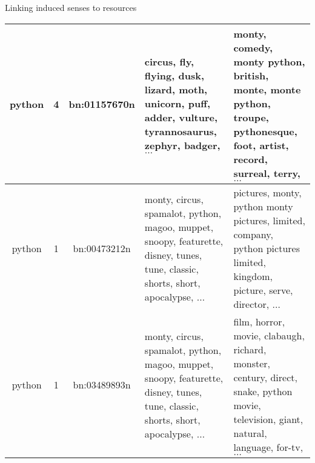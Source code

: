 \begin{frame}{ Linking induced senses to resources }
\begin{table}
\begin{center}
\begin{tabular}{ccc p{3cm} p{3cm}}
python & 4 & bn:01157670n & circus, fly, flying, dusk, lizard, moth, unicorn, puff, adder, vulture, tyrannosaurus, zephyr, badger, $\ldots$ & monty, comedy, monty python, british, monte, monte python, troupe, pythonesque, foot, artist, record, surreal, terry, $\ldots$ \\ \hline

python & 1 & bn:00473212n  & monty, circus, spamalot, python, magoo, muppet, snoopy, featurette, disney, tunes, tune, classic, shorts, short, apocalypse, $\ldots$ &  pictures, monty, python monty pictures, limited, company, python pictures limited, kingdom, picture, serve, director, $\ldots$ \\ \hline

python & 1 & bn:03489893n  & monty, circus, spamalot, python, magoo, muppet, snoopy, featurette, disney, tunes, tune, classic, shorts, short, apocalypse, $\ldots$ &  film, horror, movie, clabaugh, richard, monster, century, direct, snake, python movie, television, giant, natural, language, for-tv, $\ldots$ 
\end{tabular}
\end{center}
\end{table}
	
	
\end{frame}


